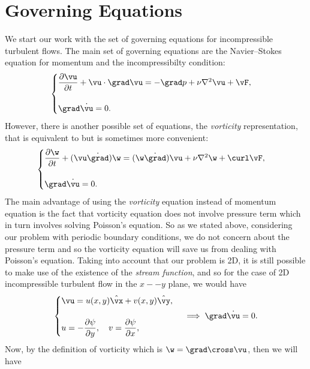 \documentclass[12pt]{article}
\def\v{\bm}
\def\div{\grad\dot}
\def\lap{{\nabla}^2}
\def\vw{{\v\w}}
\def\hyperindex#1{\index{#1}\hypertarget{#1}}
\def\In#1{\hyperindex{#1}{\emph{#1}}}
\begin{document}
\section{Governing Equations}
We start our work with the set of governing equations for incompressible
turbulent flows. The main set of governing equations are the Navier--Stokes equation for momentum and the incompressibilty condition:
\begin{equation}
\begin{cases}
\dfrac{\partial \vu}{\partial t} + \vu\cdot\grad\vu = -\grad p + \nu\lap\vu + \vF,\\
\\
\div \vu=0.\label{GE}
\end{cases}
\end{equation}
However, there is another possible set of equations,
the \In{vorticity} representation, that is equivalent to  but is
sometimes more convenient:
\begin{equation}\label{vorticity}
\begin{cases}
\dfrac{\partial{\vw}}{\partial t} + (\vu\dot\grad)\vw=(\vw\dot\grad)\vu + \nu\lap\vw + \curl\vF,\\
\\
\div \vu=0.
\end{cases}
\end{equation}
The main advantage of using the \emph{vorticity} equation instead of momentum equation is the fact that vorticity equation does not involve pressure term which in turn involves solving Poisson's equation. So as we stated above, considering our problem with periodic boundary conditions, we do not concern about the pressure term and so the vorticity equation will save us from dealing with Poisson's equation. Taking into account that our problem is 2D, it is still possible to make use of the existence of the
\emph{stream function}, and so for the case of 2D incompressible turbulent flow in the $x--y$ plane, we would have
\begin{equation}
\begin{cases}
\vu=u(x,y)\hat{\vx}+v(x,y)\hat{\vy}, \\
\hspace{3.5cm} 		\\
u=-\dfrac{\partial\psi}{\partial y},\quad v=\dfrac{\partial\psi}{\partial x}, \label{streamfunction}
\end{cases}\implies \div\vu=0.
\end{equation}
Now, by the definition of vorticity which is $\vw=\grad\cross\vu$, then we will have
\end{document}
